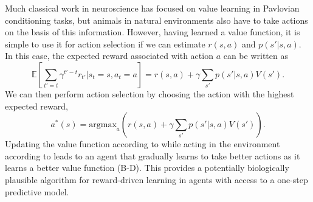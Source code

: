 Much classical work in neuroscience has focused on value learning in Pavlovian conditioning tasks, but animals in natural environments also have to take actions on the basis of this information.
However, having learned a value function, it is simple to use it for action selection if we can estimate $r(s, a)$ and $p(s' | s, a)$.
In this case, the expected reward associated with action $a$ can be written as
\begin{equation}
    \mathbb{E} \left [\sum_{t' = t} \gamma^{t'-t} r_{t'} | s_t = s, a_t = a \right ] = r(s, a) + \gamma \sum_{s'} p( s' | s, a) V(s').
\end{equation}
We can then perform action selection by choosing the action with the highest expected reward,
\begin{equation}
    \label{eq:value_action_selection}
    a^*(s) = \text{argmax}_{a} \left ( r(s, a) + \gamma \sum_{s'} p(s' | s, a) V(s') \right ).
\end{equation}
Updating the value function according to  while acting in the environment according to  leads to an agent that gradually learns to take better actions as it learns a better value function (B-D).
This provides a potentially biologically plausible algorithm for reward-driven learning in agents with access to a one-step predictive model.

